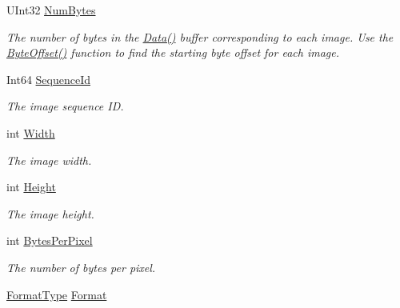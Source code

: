 \begin{DoxyCompactItemize}
\item 
U\+Int32 \mbox{\hyperlink{class_leap_1_1_image_a531668f24d32026f61ef2affb12be758}{Num\+Bytes}}
\begin{DoxyCompactList}\small\item\em The number of bytes in the \mbox{\hyperlink{class_leap_1_1_image_a13a2744f47a3bb324d08dca19d971f17}{Data()}} buffer corresponding to each image. Use the \mbox{\hyperlink{class_leap_1_1_image_aaab2f799bc4f2f315c26d14401b8a7e7}{Byte\+Offset()}} function to find the starting byte offset for each image. \end{DoxyCompactList}\item 
Int64 \mbox{\hyperlink{class_leap_1_1_image_aa9411917ca37f9f0b6d2f2c0e7b37d81}{Sequence\+Id}}
\begin{DoxyCompactList}\small\item\em The image sequence ID. \end{DoxyCompactList}\item 
int \mbox{\hyperlink{class_leap_1_1_image_a66b413ab158bf69102be0a58056a34b6}{Width}}
\begin{DoxyCompactList}\small\item\em The image width. \end{DoxyCompactList}\item 
int \mbox{\hyperlink{class_leap_1_1_image_a00971100533a392e69ed78069340954b}{Height}}
\begin{DoxyCompactList}\small\item\em The image height. \end{DoxyCompactList}\item 
int \mbox{\hyperlink{class_leap_1_1_image_ae1866274238f8727fddcb387a6dc0ab0}{Bytes\+Per\+Pixel}}
\begin{DoxyCompactList}\small\item\em The number of bytes per pixel. \end{DoxyCompactList}\item 
\mbox{\hyperlink{class_leap_1_1_image_acefbe5d3803afc9f433a6e3856d242d1}{Format\+Type}} \mbox{\hyperlink{class_leap_1_1_image_a87defbae65a250428b3b938b9ff7ae22}{Format}}

\end{DoxyCompactItemize}
